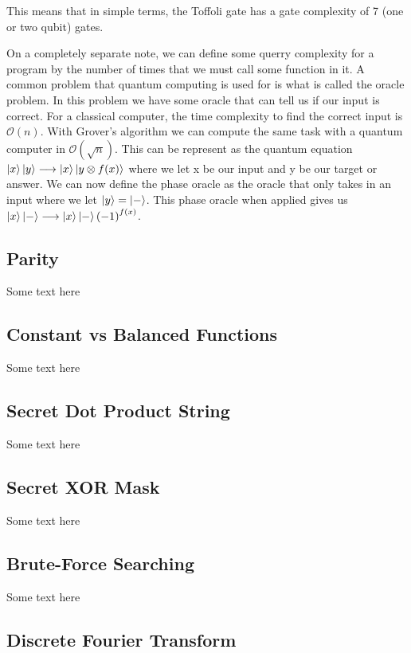 \documentclass{article}
\begin{document}
\noindent This means that in simple terms, the Toffoli gate has a gate complexity of 7 (one or two qubit) gates.


\noindent On a completely separate note, we can define some querry complexity for a program by the number of times that we must call some function in it. A common problem that quantum computing is used for is what is called the oracle problem. In this problem we have some oracle that can tell us if our input is correct. For a classical computer, the time complexity to find the correct input is $\mathcal{O}(n)$. With Grover's algorithm we can compute the same task with a quantum computer in $\mathcal{O}(\sqrt{n})$. This can be represent as the quantum equation $\ket{x}\ket{y}\longrightarrow\ket{x}\ket{y\otimes f(x)}$ where we let x be our input and y be our target or answer. We can now define the phase oracle as the oracle that only takes in an input where we let $\ket{y} = \ket{-}$. This phase oracle when applied gives us $\ket{x}\ket{-}\longrightarrow\ket{x}\ket{-}{(-1)}^{f(x)}$. 

\subsection{Parity}

Some text here

\subsection{Constant vs Balanced Functions}

Some text here

\subsection{Secret Dot Product String}

Some text here

\subsection{Secret XOR Mask}

Some text here

\subsection{Brute-Force Searching}

Some text here

\subsection{Discrete Fourier Transform}
\end{document}
